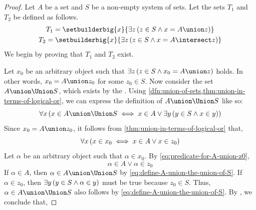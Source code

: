 \begin{proof}
    Let \( A \) be a set and \( S \) be a non-empty system of sets. Let the sets \( T_{1} \) and \( T_{2} \)
    be defined as follows.
    \begin{gather}
        T_{1} =
        \setbuilderbig{x}{\exists z \, \mleft( z \in S \land x = A \union z \mright)} \label{eq:define-T1} \\
        T_{2} =
        \setbuilderbig{x}{\exists z \, \mleft( z \in S \land x = A \intersect z \mright)} \label{eq:define-T2}
    \end{gather}
    We begin by proving that \( T_{1} \) and \( T_{2} \) exist.

    \vspace{0.5cm}
    \noindent
    Let \( x_{0} \) be an arbitrary object such that
    \( \exists z \, \mleft( z \in S \land x_{0} = A \union z \mright) \) holds.
    In other words, \( x_{0} = A \union z_{0} \) for some \( z_{0} \in S \).
    Now consider the set \( A \union \Union S \), which exists by the .
    Using \cref{dfn:union-of-sets,thm:union-in-terms-of-logical-or}, we can express the definition
    of \( A \union \Union S \) like so:
    \begin{equation}
        \label{eq:define-A-union-the-union-of-S}
        \forall x \, \mleft( x \in A \union \Union S
        \iff
        x \in A \lor
        \exists y \, \mleft( y \in S \land x \in y \mright)\mright)
    \end{equation}
    Since \( x_{0} = A \union z_{0} \), it follows from \cref{thm:union-in-terms-of-logical-or}
    that,
    \begin{equation}
        \label{eq:predicate-for-A-union-z0}
        \forall x \, \mleft( x \in x_{0}
        \iff
        x \in A \lor x \in  z_{0} \mright)
    \end{equation}
    Let \( \alpha \) be an arbitrary object such that \( \alpha \in x_{0} \). By \eqref{eq:predicate-for-A-union-z0},
    \begin{equation*}
        \alpha \in A \lor \alpha \in z_{0}
    \end{equation*}
    If \( \alpha \in A \), then \( \alpha \in A \union \Union S \) by \eqref{eq:define-A-union-the-union-of-S}. If
    \( \alpha \in z_{0} \), then \( \exists y \, \mleft( y \in S \land \alpha \in y \mright) \) must be true
    because \( z_{0} \in S \). Thus, \( \alpha \in A \union \Union S \) also follows by \eqref{eq:define-A-union-the-union-of-S}.
    By , we conclude that,

\end{proof}
